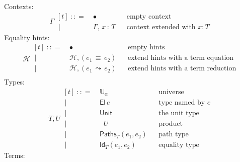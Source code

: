 \documentclass{article}
\newcommand{\G}{\Gamma} %
\newcommand{\T}{T} %
\newcommand{\U}{U} %
\newcommand{\x}{x} %
\newcommand{\e}{e} %
\newcommand{\bnf}{\ \mathrel{{:}{:}{=}}\ }
\newcommand{\bnfor}{\ \mid\ \ }
\newcommand{\ctxempty}{\bullet} %
\newcommand{\ctxextend}[3]{#1,\, #2\, {:}\, #3} %
\newcommand{\Universe}[1]{\mathbb{U}_{#1}} %
\newcommand{\El}[1]{\mathsf{El}\, #1} %
\newcommand{\Unit}{\mathsf{Unit}} %
\newcommand{\Prod}[2]{\mathop{\textstyle\prod_{(#1 {:} #2)}}} %
\newcommand{\PrEqual}[3]{\mathsf{Paths}_{#1}(#2,#3)} %
\newcommand{\JuEqual}[3]{\mathsf{Id}_{#1}(#2,#3)} %
\newcommand{\eqtermhint}[2]{(#1 \,{\equiv}\, #2)} %
\newcommand{\redtermhint}[2]{(#1 \,{\leadsto}\, #2)} %
\renewcommand{\H}{\mathcal{H}}      %
\newcommand{\addhinteq}[3]{#1, \eqtermhint{#2}{#3}} %
\newcommand{\addhintred}[3]{#1, \redtermhint{#2}{#3}} %
\begin{document}
Contexts:
%
\begin{equation*}
  \G
  \begin{aligned}[t]
    \bnf   {}& \ctxempty & & \text{empty context}\\
    \bnfor {}& \ctxextend{\G}{\x}{\T} & & \text{context extended with $x : T$}
  \end{aligned}
\end{equation*}
%
Equality hints:
%
\begin{equation*}
  \H
  \begin{aligned}[t]
    \bnf   {}& \ctxempty & & \text{empty hints}\\
    \bnfor {}& \addhinteq{\H}{\e_1}{\e_2} & & \text{extend hints with a term equation} \\
    \bnfor {}& \addhintred{\H}{\e_1}{\e_2} & & \text{extend hints with a term reduction} \\
  \end{aligned}
\end{equation*}
%
Types:
%
\begin{equation*}
  \T, \U
  \begin{aligned}[t]
    \bnf   {}& \Universe{\alpha} & & \text{universe}\\
    \bnfor {}& \El{\e} & & \text{type named by $e$}\\
    \bnfor {}& \Unit & & \text{the unit type}\\
    \bnfor {}& \Prod{x}{\T} \U & & \text{product}\\
    \bnfor {}& \PrEqual{T}{\e_1}{\e_2} & & \text{path type}\\
    \bnfor {}& \JuEqual{T}{\e_1}{\e_2} & & \text{equality type}
  \end{aligned}
\end{equation*}
%
Terms:
%
\end{document}
